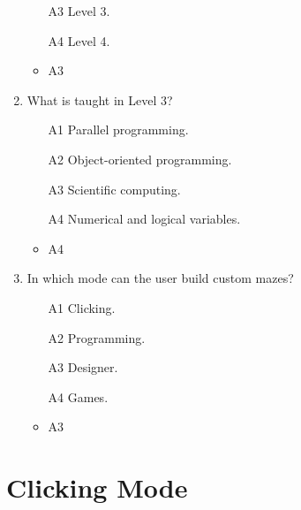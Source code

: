 \documentclass[article,A4,12pt]{llncs}
\begin{document}
\begin{enumerate}
\begin{enumerate}
\item[A3] Level 3.
\item[A4] Level 4.
\end{enumerate}
  \begin{itemize}
    \item A3
  \end{itemize}
\item What is taught in Level 3?
\begin{enumerate}
\item[A1] Parallel programming.
\item[A2] Object-oriented programming.
\item[A3] Scientific computing.
\item[A4] Numerical and logical variables.
\end{enumerate}
  \begin{itemize}
    \item A4
  \end{itemize}
\item In which mode can the user build custom mazes?
\begin{enumerate}
\item[A1] Clicking.
\item[A2] Programming.
\item[A3] Designer.
\item[A4] Games.
\end{enumerate}
  \begin{itemize}
    \item A3
  \end{itemize}
\end{enumerate}

\section{Clicking Mode}
\end{document}
